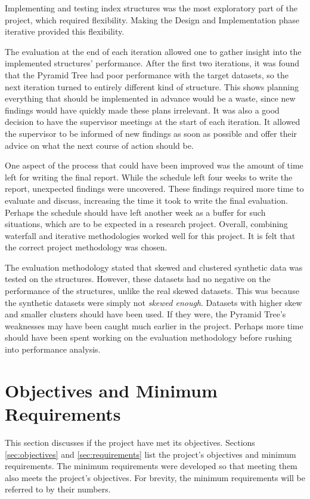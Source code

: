 Implementing and testing index structures was the most exploratory part of the project, which required flexibility. Making the Design and Implementation phase iterative provided this flexibility.

The evaluation at the end of each iteration allowed one to gather insight into the implemented structures' performance. After the first two iterations, it was found that the Pyramid Tree had poor performance with the target datasets, so the next iteration turned to entirely different kind of structure. This shows planning everything that should be implemented in advance would be a waste, since new findings would have quickly made these plans irrelevant. It  was also a good decision to have the supervisor meetings at the start of each iteration. It allowed the supervisor to be informed of new findings as soon as possible and offer their advice on what the next course of action should be.

One aspect of the process that could have been improved was the amount of time left for writing the final report. While the schedule left four weeks to write the report, unexpected findings were uncovered. These findings required more time to evaluate and discuss, increasing the time it took to write the final evaluation. Perhaps the schedule should have left another week as a buffer for such situations, which are to be expected in a research project. Overall, combining waterfall and iterative methodologies worked well for this project. It is felt that the correct project methodology was chosen.

The evaluation methodology stated that skewed and clustered synthetic data was tested on the structures. However, these datasets had no negative on the performance of the structures, unlike the real skewed datasets. This was because the synthetic datasets were simply not \textit{skewed enough}. Datasets with higher skew and smaller clusters should have been used. If they were, the Pyramid Tree's weaknesses may have been caught much earlier in the project. Perhaps more time should have been spent working on the evaluation methodology before rushing into performance analysis.

\section{Objectives and Minimum Requirements}

This section discusses if the project have met its objectives. Sections \ref{sec:objectives} and \ref{sec:requirements} list the project's objectives and minimum requirements. The minimum requirements were developed so that meeting them also meets the project's objectives. For brevity, the minimum requirements will be referred to by their numbers.

